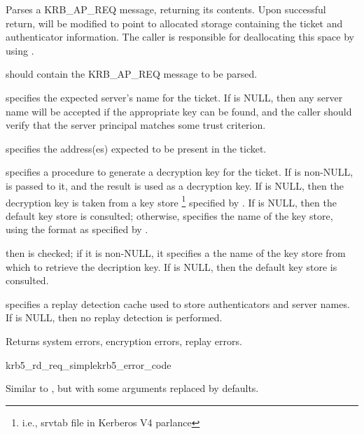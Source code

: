 Parses a KRB_AP_REQ message, returning its contents.  Upon successful
return,
 will be modified to point to allocated storage
containing the ticket and authenticator information.  The caller is
responsible for deallocating this space by using
.

 should contain the KRB_AP_REQ message to be parsed.

 specifies the expected server's name for the ticket.
If  is NULL, then any server name will be accepted if
the appropriate key can be found, and the caller should verify that the
server principal matches some trust criterion.

 specifies the address(es) expected to be present
in the ticket.

 specifies a procedure to generate a decryption key for the
ticket.  If  is non-NULL,  is
passed to it, and the result is used as a decryption key. If
 is NULL, then the decryption key is taken from a key store
\footnote{i.e., srvtab file in Kerberos V4 parlance} specified by
.  If  is NULL, then the
default key store is consulted; otherwise, 
specifies the name of the key store, using the format as specified by
.



 then  is checked; if
it is non-NULL, it specifies a the name of the key store from which to
retrieve the decription key.  If  is NULL, then
the default key store is consulted.

 specifies a replay detection cache used to store
authenticators and server names.  If  is NULL, then no
replay detection is performed.

Returns system errors, encryption errors, replay errors.

\begin{funcdecl}{krb5_rd_req_simple}{krb5_error_code}{\funcin}
\funcout
{}
\end{funcdecl}

Similar to , but with some arguments replaced by
defaults.

